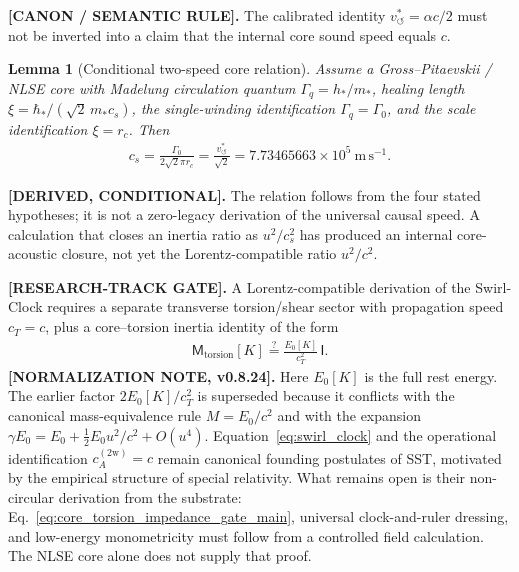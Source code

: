 \documentclass[11pt]{article}
\theoremstyle{definition}
\theoremstyle{plain}
\newtheorem{lemma}{Lemma}[section]
\theoremstyle{remark}
\newcommand{\rc}{{r_c}}
\newcommand{\vchar}{v_{\!\boldsymbol{\circlearrowleft}}^{\ast}}
\begin{document}
        \textbf{[CANON / SEMANTIC RULE].}
        The calibrated identity \(\vchar=\alpha c/2\) must not be inverted into a
        claim that the internal core sound speed equals \(c\).

        \begin{lemma}[Conditional two-speed core relation]
        \label{lem:conditional_two_speed_core_relation}
        Assume a Gross--Pitaevskii / NLSE core with Madelung circulation quantum
        \(\Gamma_q=h_*/m_*\), healing length
        \(\xi=\hbar_*/(\sqrt{2}\,m_*c_s)\), the single-winding identification
        \(\Gamma_q=\Gamma_0\), and the scale identification \(\xi=\rc\).  Then
        \begin{align}
            c_s
            =
            \frac{\Gamma_0}{2\sqrt{2}\pi\rc}
            =
            \frac{\vchar}{\sqrt{2}}
            =
            7.73465663\times10^{5}\ \mathrm{m\,s^{-1}}.
            \label{eq:core_sound_speed_vchar_over_sqrt2}
        \end{align}
        \end{lemma}
        \textbf{[DERIVED, CONDITIONAL].}
        The relation follows from the four stated hypotheses; it is not a
        zero-legacy derivation of the universal causal speed.  A calculation that
        closes an inertia ratio as \(u^2/c_s^2\) has produced an internal
        core-acoustic closure, not yet the Lorentz-compatible ratio \(u^2/c^2\).

        \textbf{[RESEARCH-TRACK GATE].}
        A Lorentz-compatible derivation of the Swirl-Clock requires a separate
        transverse torsion/shear sector with propagation speed \(c_T=c\), plus a
        core--torsion inertia identity of the form
        \begin{align}
            \mathsf M_{\mathrm{torsion}}[K]
            \stackrel{?}{=}
            \frac{E_0[K]}{c_T^2}\,\mathsf I .
            \label{eq:core_torsion_impedance_gate_main}
        \end{align}
        \textbf{[NORMALIZATION NOTE, v0.8.24].}
        Here \(E_0[K]\) is the full rest energy.  The earlier factor
        \(2E_0[K]/c_T^2\) is superseded because it conflicts with the canonical
        mass-equivalence rule \(M=E_0/c^2\) and with the expansion
        \(\gamma E_0=E_0+\tfrac12E_0u^2/c^2+O(u^4)\).
        Equation~\eqref{eq:swirl_clock} and the operational identification
        \(c_A^{(2\mathrm w)}=c\) remain canonical founding postulates of SST,
        motivated by the empirical structure of special relativity.  What remains
        open is their non-circular derivation from the substrate:
        Eq.~\eqref{eq:core_torsion_impedance_gate_main}, universal clock-and-ruler
        dressing, and low-energy monometricity must follow from a controlled field
        calculation.  The NLSE core alone does not supply that proof.
\end{document}
